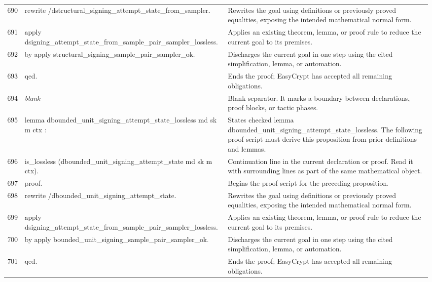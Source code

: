 \documentclass[10pt]{article}
\begin{document}
\begin{longtable}{r L{0.53\textwidth} L{0.37\textwidth}}
690 & {\ttfamily\scriptsize rewrite /dstructural\_signing\_attempt\_state\_from\_sampler.} & Rewrites the goal using definitions or previously proved equalities, exposing the intended mathematical normal form. \\
691 & {\ttfamily\scriptsize apply dsigning\_attempt\_state\_from\_sample\_pair\_sampler\_lossless.} & Applies an existing theorem, lemma, or proof rule to reduce the current goal to its premises. \\
692 & {\ttfamily\scriptsize by apply structural\_signing\_sample\_pair\_sampler\_ok.} & Discharges the current goal in one step using the cited simplification, lemma, or automation. \\
693 & {\ttfamily\scriptsize qed.} & Ends the proof; EasyCrypt has accepted all remaining obligations. \\
694 & {\ttfamily\scriptsize \emph{blank}} & Blank separator.  It marks a boundary between declarations, proof blocks, or tactic phases. \\
695 & {\ttfamily\scriptsize lemma dbounded\_unit\_signing\_attempt\_state\_lossless md sk m ctx :} & States checked lemma dbounded\_unit\_signing\_attempt\_state\_lossless.  The following proof script must derive this proposition from prior definitions and lemmas. \\
696 & {\ttfamily\scriptsize   is\_lossless (dbounded\_unit\_signing\_attempt\_state md sk m ctx).} & Continuation line in the current declaration or proof.  Read it with surrounding lines as part of the same mathematical object. \\
697 & {\ttfamily\scriptsize proof.} & Begins the proof script for the preceding proposition. \\
698 & {\ttfamily\scriptsize rewrite /dbounded\_unit\_signing\_attempt\_state.} & Rewrites the goal using definitions or previously proved equalities, exposing the intended mathematical normal form. \\
699 & {\ttfamily\scriptsize apply dsigning\_attempt\_state\_from\_sample\_pair\_sampler\_lossless.} & Applies an existing theorem, lemma, or proof rule to reduce the current goal to its premises. \\
700 & {\ttfamily\scriptsize by apply bounded\_unit\_signing\_sample\_pair\_sampler\_ok.} & Discharges the current goal in one step using the cited simplification, lemma, or automation. \\
701 & {\ttfamily\scriptsize qed.} & Ends the proof; EasyCrypt has accepted all remaining obligations. \\

\end{longtable}
\end{document}
